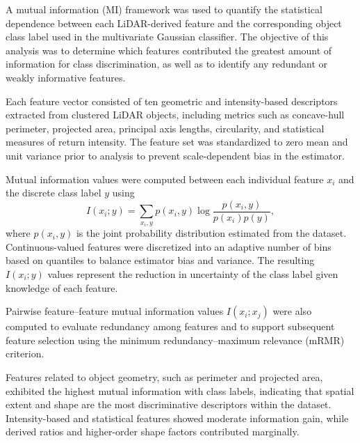 \documentclass[../main.tex]{subfiles}
\begin{document}

A mutual information (MI) framework was used to quantify the statistical dependence between each LiDAR-derived feature and the corresponding object class label used in the multivariate Gaussian classifier. 
The objective of this analysis was to determine which features contributed the greatest amount of information for class discrimination, as well as to identify any redundant or weakly informative features.

Each feature vector consisted of ten geometric and intensity-based descriptors extracted from clustered LiDAR objects, including metrics such as concave-hull perimeter, projected area, principal axis lengths, circularity, and statistical measures of return intensity. 
The feature set was standardized to zero mean and unit variance prior to analysis to prevent scale-dependent bias in the estimator.

Mutual information values were computed between each individual feature $x_i$ and the discrete class label $y$ using
\[
I(x_i; y) = \sum_{x_i,y} p(x_i, y) \log \frac{p(x_i, y)}{p(x_i) p(y)},
\]
where $p(x_i, y)$ is the joint probability distribution estimated from the dataset.
Continuous-valued features were discretized into an adaptive number of bins based on quantiles to balance estimator bias and variance.
The resulting $I(x_i; y)$ values represent the reduction in uncertainty of the class label given knowledge of each feature.

Pairwise feature–feature mutual information values $I(x_i; x_j)$ were also computed to evaluate redundancy among features and to support subsequent feature selection using the minimum redundancy–maximum relevance (mRMR) criterion.

Features related to object geometry, such as perimeter and projected area, exhibited the highest mutual information with class labels, indicating that spatial extent and shape are the most discriminative descriptors within the dataset. 
Intensity-based and statistical features showed moderate information gain, while derived ratios and higher-order shape factors contributed marginally.
\end{document}
